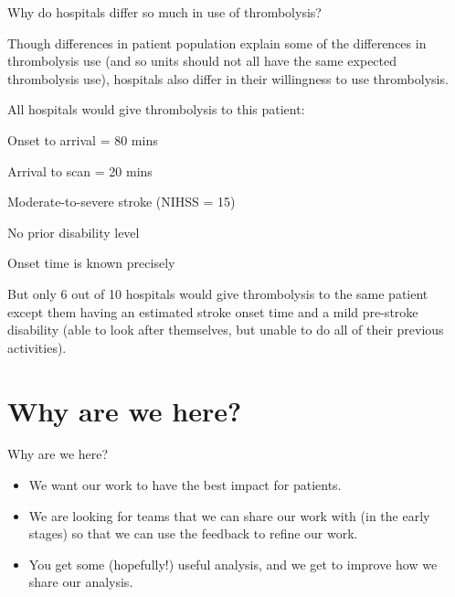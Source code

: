 \documentclass{beamer}
\begin{document}
\begin{frame}{Why do hospitals differ so much in use of thrombolysis?}

Though differences in patient population explain some of the differences in thrombolysis use (and so units should not all have the same expected thrombolysis use), hospitals also differ in their willingness to use thrombolysis.

\vspace{3mm}

All hospitals would give thrombolysis to this patient:
\begin{itemize}
\begin{footnotesize}
    \item Onset to arrival = 80 mins
    \item Arrival to scan = 20 mins
    \item Moderate-to-severe stroke (NIHSS = 15)
    \item No prior disability level 
    \item Onset time is known precisely
\end{footnotesize}
\end{itemize}

\vspace{3mm}

But only 6 out of 10 hospitals would give thrombolysis to the same patient except them having an estimated stroke onset time and a mild pre-stroke disability (able to look after themselves, but unable to do all of their previous activities).

\end{frame}


\section{Why are we here?}


\begin{frame}{Why are we here?}

\begin{itemize}
    \setlength{\itemsep}{5mm}
    
    \item We want our work to have the best impact for patients.
    
    \item We are looking for teams that we can share our work with (in the early stages) so that we can use the feedback to refine our work.

    \item You get some (hopefully!) useful analysis, and we get to improve how we share our analysis.

\end{itemize}
\end{frame}
\end{document}
